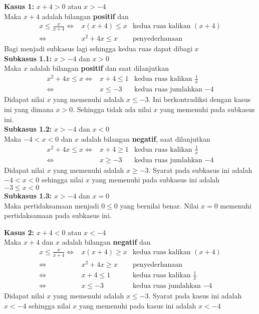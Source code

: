 \begin{enumerate}[leftmargin=*, label={\arabic*}.]
\begin{enumerate}[label={\alph*}.]
\textbf{Kasus 1: }$x+4 > 0$ atau $x>-4$\\
Maka $x+4$ adalah bilangan \textbf{positif} dan
\begin{align*}
    x \leq \frac{x}{x+4}
    \iff &x(x+4) \leq x
    &\text{kedua ruas kalikan $(x+4)$}\\
    \iff &x^{2}+4x \leq x
    &\text{penyederhanaan}
\end{align*}
Bagi menjadi subkasus lagi sehingga kedua ruas dapat dibagi $x$\\
\textbf{Subkasus 1.1: }$x>-4$ dan $x>0$\\
Maka $x$ adalah bilangan \textbf{positif} dan saat dilanjutkan
\begin{align*}
    x^{2}+4x \leq x
    \iff &x+4 \leq 1
    &\text{kedua ruas kalikan $\frac{1}{x}$}\\
    \iff &x \leq -3
    &\text{kedua ruas jumlahkan $-4$}
\end{align*}
Didapat nilai $x$ yang memenuhi adalah $x\leq -3$. Ini berkontradiksi dengan
kasus ini yang dimana $x > 0$. Sehingga tidak ada nilai $x$ yang memenuhi
pada subkasus ini. \\
\textbf{Subkasus 1.2: }$x>-4$ dan $x<0$\\
Maka $-4 < x < 0$ dan $x$ adalah bilangan \textbf{negatif}, saat dilanjutkan
\begin{align*}
    x^{2}+4x \leq x
    \iff &x+4 \geq 1
    &\text{kedua ruas kalikan $\frac{1}{x}$}\\
    \iff &x \geq -3
    &\text{kedua ruas jumlahkan $-4$}
\end{align*}
Didapat nilai $x$ yang memenuhi adalah $x \geq -3$. Syarat pada subkasus
ini adalah $-4 < x < 0$ sehingga nilai $x$ yang memenuhi pada subkasus ini
adalah $-3 \leq x < 0$ \\
\textbf{Subkasus 1.3: }$x>-4$ dan $x=0$\\
Maka pertidaksamaan menjadi $0 \leq 0$ yang bernilai benar. Nilai $x=0$
memenuhi pertidaksamaan pada subkasus ini.

\textbf{Kasus 2: }$x+4 < 0$ atau $x < -4$\\
Maka $x+4$ dan $x$ adalah bilangan \textbf{negatif} dan
\begin{align*}
    x \leq \frac{x}{x+4}
    \iff &x(x+4) \geq x
    &\text{kedua ruas kalikan $(x+4)$}\\
    \iff &x^{2}+4x \geq x
    &\text{penyederhanaan}\\
    \iff &x+4 \leq 1
    &\text{kedua ruas kalikan $\frac{1}{x}$}\\
    \iff &x \leq -3
    &\text{kedua ruas jumlahkan $-4$}
\end{align*}
Didapat nilai $x$ yang memenuhi adalah $x \leq -3$. Syarat pada kasus
ini adalah $x < -4$ sehingga nilai $x$ yang memenuhi pada kasus ini
adalah $x < -4$ \\
    

\end{enumerate}
\end{enumerate}
